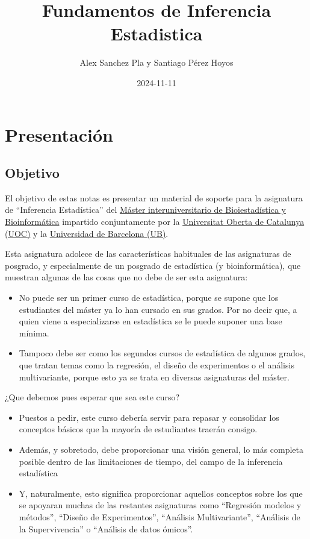 \documentclass[
]{article}
\title{Fundamentos de Inferencia Estadistica}
\author{Alex Sanchez Pla y Santiago Pérez Hoyos}
\date{2024-11-11}
\providecommand{\tightlist}{%
  \setlength{\itemsep}{0pt}\setlength{\parskip}{0pt}}
\begin{document}
\maketitle

{
\setcounter{tocdepth}{2}
\tableofcontents
}
\section*{Presentación}\label{presentaciuxf3n}

\subsection*{Objetivo}\label{objetivo}

El objetivo de estas notas es presentar un material de soporte para la asignatura de ``Inferencia Estadística'' del \href{https://www.uoc.edu/es/estudios/masters/master-universitario-bioinformatica-bioestadistica}{Máster interuniversitario de Bioiestadística y Bioinformática} impartido conjuntamente por la \href{https://www.uoc.edu}{Universitat Oberta de Catalunya (UOC)} y la \href{https://www.ub.edu}{Universidad de Barcelona (UB)}.

Esta asignatura adolece de las características habituales de las asignaturas de posgrado, y especialmente de un posgrado de estadística (y bioinformática), que muestran algunas de las cosas que no debe de ser esta asignatura:

\begin{itemize}
\tightlist
\item
  No puede ser un primer curso de estadística, porque se supone que los estudiantes del máster ya lo han cursado en sus grados. Por no decir que, a quien viene a especializarse en estadística se le puede suponer una base mínima.
\item
  Tampoco debe ser como los segundos cursos de estadística de algunos grados, que tratan temas como la regresión, el diseño de experimentos o el análisis multivariante, porque esto ya se trata en diversas asignaturas del máster.
\end{itemize}

¿Que debemos pues esperar que sea este curso?

\begin{itemize}
\tightlist
\item
  Puestos a pedir, este curso debería servir para repasar y consolidar los conceptos básicos que la mayoría de estudiantes traerán consigo.
\item
  Además, y sobretodo, debe proporcionar una visión general, lo más completa posible dentro de las limitaciones de tiempo, del campo de la inferencia estadística
\item
  Y, naturalmente, esto significa proporcionar aquellos conceptos sobre los que se apoyaran muchas de las restantes asignaturas como ``Regresión modelos y métodos'', ``Diseño de Experimentos'', ``Análisis Multivariante'', ``Análisis de la Supervivencia'' o ``Análisis de datos ómicos''.
\end{itemize}
\end{document}
